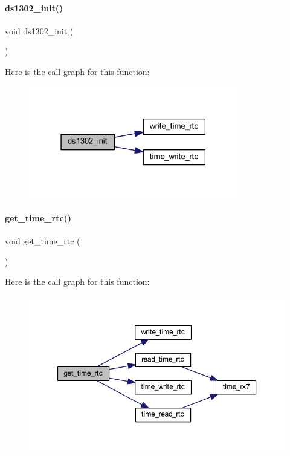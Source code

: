 \paragraph{ds1302\+\_\+init()}
{\footnotesize\ttfamily void ds1302\+\_\+init (\begin{DoxyParamCaption}{ }\end{DoxyParamCaption})}

Here is the call graph for this function\+:
\nopagebreak
\begin{figure}[H]
\begin{center}
\leavevmode
\includegraphics[width=259pt]{a00041_a0665eb059e742e4bb5a419144336e147_cgraph}
\end{center}
\end{figure}
\mbox{\label{a00041_a628868f4036626e8fa1b055bf56dc2f1}} 
\paragraph{get\+\_\+time\+\_\+rtc()}
{\footnotesize\ttfamily void get\+\_\+time\+\_\+rtc (\begin{DoxyParamCaption}{ }\end{DoxyParamCaption})}

Here is the call graph for this function\+:
\nopagebreak
\begin{figure}[H]
\begin{center}
\leavevmode
\includegraphics[width=350pt]{a00041_a628868f4036626e8fa1b055bf56dc2f1_cgraph}
\end{center}
\end{figure}
\mbox{\label{a00041_a4144a5333b1a934957b78e4b2d0f8695}} 
